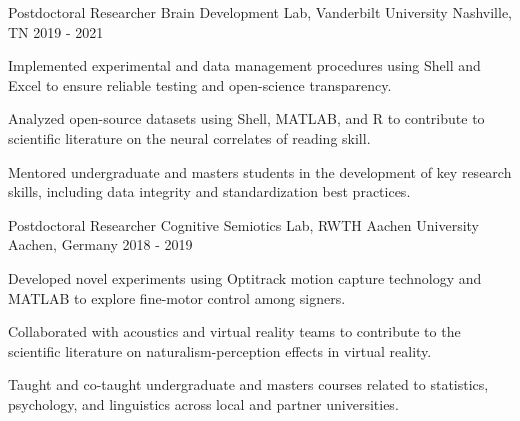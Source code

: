\begin{cventries}
{\begin{cvitems}
      \end{cvitems}
    }
\vspace{\baselineskip}  
  \cventry
    {Postdoctoral Researcher}
    {Brain Development Lab, Vanderbilt University}
    {Nashville, TN}
    {2019 - 2021}
    {
      \begin{cvitems}
        \item {Implemented experimental and data management procedures using Shell and Excel to ensure reliable testing and open-science transparency.}
        \item {Analyzed open-source datasets using Shell, MATLAB, and R to contribute to scientific literature on the neural correlates of reading skill.}
        \item {Mentored undergraduate and masters students in the development of key research skills, including data integrity and standardization best practices.}
      \end{cvitems}
    }
\vspace{\baselineskip}  
  \cventry
    {Postdoctoral Researcher}
    {Cognitive Semiotics Lab, RWTH Aachen University}
    {Aachen, Germany}
    {2018 - 2019}
    {
      \begin{cvitems}
        \item {Developed novel experiments using Optitrack motion capture technology and MATLAB to explore fine-motor control among signers.}
        \item {Collaborated with acoustics and virtual reality teams to contribute to the scientific literature on naturalism-perception effects in virtual reality.}
        \item {Taught and co-taught undergraduate and masters courses related to statistics, psychology, and linguistics across local and partner universities.}
      \end{cvitems}
    }
\vspace{\baselineskip}  
  \cventry

\end{cventries}
